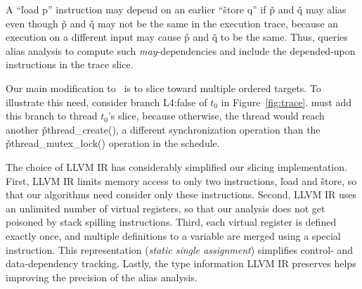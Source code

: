 A ``\v{load p}'' instruction may depend on an earlier ``\v{store q}'' if
\v{p} and \v{q} may alias even though \v{p} and \v{q} may not be the
same in the execution trace, because an execution on a different input
may cause \v{p} and \v{q} to be the same.  Thus, \peregrine queries alias
analysis to compute such \emph{may}-dependencies and include the depended-upon
instructions in the trace slice.


Our main modification to~\cite{castro:bouncer} is to slice toward multiple
ordered targets.  To illustrate this need, consider branch L4:false of
$t_0$ in Figure~\ref{fig:trace}.  \peregrine must add this branch  to thread
$t_0$'s slice, because otherwise, the thread would reach another
\v{pthread\_create()}, a different synchronization operation than the
\v{pthread\_mutex\_lock()} operation in the schedule.


The choice of LLVM IR has considerably simplified our slicing
implementation.  First, LLVM IR limits memory access to only two
instructions, \v{load} and \v{store}, so that our
algorithms need consider only these
instructions.  Second, LLVM IR uses an unlimited number of virtual registers,
so that our analysis does not get poisoned by stack spilling instructions.
Third, each virtual register is defined exactly once, and multiple
definitions to a variable are merged using a special instruction.  This
representation (\emph{static single assignment}) simplifies
control- and data-dependency tracking.  Lastly, the type information LLVM IR
preserves helps improving the precision of the alias analysis.





